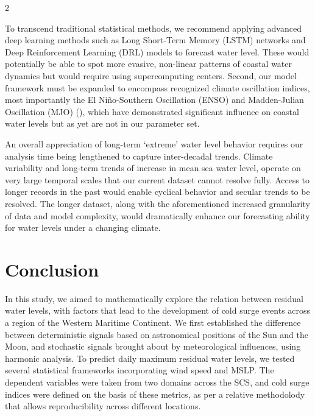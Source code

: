 \documentclass[12pt]{article}
\begin{document}
\begin{multicols}{2}
    \begin{paragraph}
        \noindent To transcend traditional statistical methods, we recommend applying advanced deep learning methods such as Long Short-Term Memory (LSTM) networks and Deep Reinforcement Learning (DRL) models to forecast water level. These would potentially be able to spot more evasive, non-linear patterns of coastal water dynamics but would require using supercomputing centers. Second, our model framework must be expanded to encompass recognized climate oscillation indices, most importantly the El Niño-Southern Oscillation (ENSO) and Madden-Julian Oscillation (MJO) (\cite{Lim2017_MonsoonRainfall}), which have demonstrated significant influence on coastal water levels but as yet are not in our parameter set.
    \end{paragraph}

    \begin{paragraph}
        \noindent An overall appreciation of long-term `extreme' water level behavior requires our analysis time being lengthened to capture inter-decadal trends. Climate variability and long-term trends of increase in mean sea water level, operate on very large temporal scales that our current dataset cannot resolve fully. Access to longer records in the past would enable cyclical behavior and secular trends to be resolved. The longer dataset, along with the aforementioned increased granularity of data and model complexity, would dramatically enhance our forecasting ability for water levels under a changing climate.
    \end{paragraph}

    
   \section*{Conclusion}
    \begin{paragraph}
        \noindent In this study, we aimed to mathematically explore the relation between residual water levels, with factors that lead to the development of cold surge events across a region of the Western Maritime Continent. We first established the difference between deterministic signals based on astronomical positions of the Sun and the Moon, and stochastic signals brought about by meteorological influences, using harmonic analysis. To predict daily maximum residual water levels, we tested several statistical frameworks incorporating wind speed and MSLP. The dependent variables were taken from two domains across the SCS, and cold surge indices were defined on the basis of these metrics, as per a relative methodolody that allows reproducibility across different locations.
    \end{paragraph}


\end{multicols}
\end{document}
